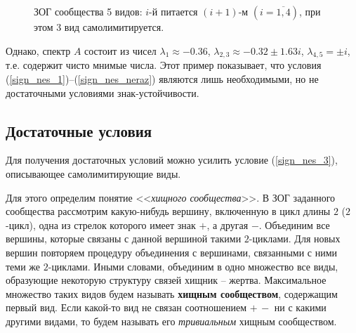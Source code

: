     \begin{figure}[H]
        \centering
        \caption{ЗОГ сообщества 5 видов: \(i\)-й питается \((i+1)\)-м \((i=\overline{1,4})\), при этом \(3\) вид самолимитируется.} \label{example_sign_unstable_zog}
    \end{figure}

    Однако, спектр \(A\) состоит из чисел \(\lambda_1 \approx -0.36\), \(\lambda_{2,3} \approx -0.32 \pm 1.63 i\), \(\lambda_{4,5} = \pm i\), т.е. содержит чисто мнимые числа. Этот пример показывает, что условия (\ref{sign_nes_1})--(\ref{sign_nes_neraz}) являются лишь необходимыми, но не достаточными условиями знак-устойчивости.


\subsection{Достаточные условия} \label{subsec:sign_dost}
    Для получения достаточных условий можно усилить условие (\ref{sign_nes_3}), описывающее самолимитирующие виды.

    Для этого определим понятие <<\textit{хищного сообщества}>>. В ЗОГ заданного сообщества рассмотрим какую-нибудь вершину, включенную в цикл длины $2$ ($2$-цикл), одна из стрелок которого имеет знак \(+\), а другая \(-\). Объединим все вершины, которые связаны с данной вершиной такими \(2\)-циклами. Для новых вершин повторяем процедуру объединения с вершинами, связанными с ними теми же \(2\)-циклами. Иными словами, объединим в одно множество все виды, образующие некоторую структуру связей хищник -- жертва. Максимальное множество таких видов будем называть \textbf{хищным сообществом}, содержащим первый вид. Если какой-то вид не связан соотношением \(+ \, -\) ни с какими другими видами, то будем называть его \textit{тривиальным} хищным сообществом.


